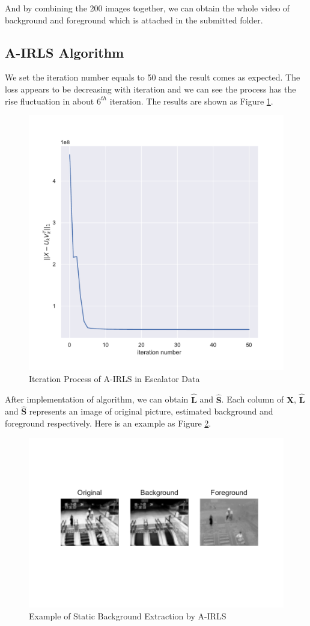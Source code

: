 \documentclass[conference]{IEEEtran}
\begin{document}
And by combining the 200 images together, we can obtain the whole video of background and foreground which is attached in the submitted folder.
\subsection{A-IRLS Algorithm}
We set the iteration number equals to 50 and the result comes as expected. The loss appears to be decreasing with iteration and we can see the process has the rise fluctuation in about $6^{th}$ iteration. The results are shown as Figure \ref{airls_es1}.

\begin{figure}[htbp]
	\centering
	\includegraphics[width=0.6\linewidth]{image/Figure 11 A-IRLS}
	\caption{Iteration Process of A-IRLS in Escalator Data}
	\label{airls_es1}
\end{figure}

After implementation of algorithm, we can obtain $\boldsymbol{\widehat{L}}$ and $\boldsymbol{\widehat{S}}$. Each column of $\boldsymbol{X}$, $\boldsymbol{\widehat{L}}$ and $\boldsymbol{\widehat{S}}$ represents an image of original picture, estimated background and foreground respectively. Here is an example as Figure \ref{airls_es2}.
\begin{figure}[htbp]
	\centering
	\includegraphics[width=1\linewidth]{image/Figure 12 A-IRLS}
	\caption{Example of Static Background Extraction by A-IRLS}
	\label{airls_es2}
\end{figure}
\end{document}
